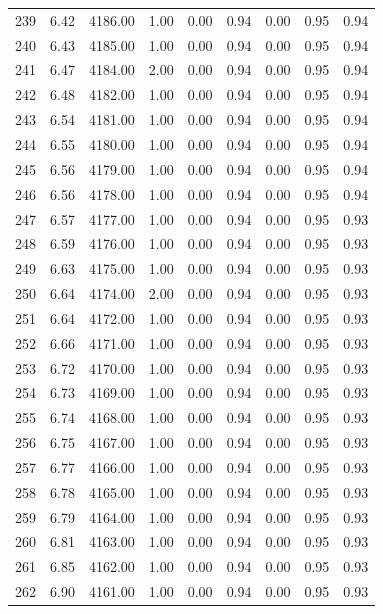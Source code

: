 \documentclass{article}\usepackage[]{graphicx}\usepackage[]{color}
\begin{document}
\begin{longtable}{rrrrrrrrr}
  239 & 6.42 & 4186.00 & 1.00 & 0.00 & 0.94 & 0.00 & 0.95 & 0.94 \\ 
  240 & 6.43 & 4185.00 & 1.00 & 0.00 & 0.94 & 0.00 & 0.95 & 0.94 \\ 
  241 & 6.47 & 4184.00 & 2.00 & 0.00 & 0.94 & 0.00 & 0.95 & 0.94 \\ 
  242 & 6.48 & 4182.00 & 1.00 & 0.00 & 0.94 & 0.00 & 0.95 & 0.94 \\ 
  243 & 6.54 & 4181.00 & 1.00 & 0.00 & 0.94 & 0.00 & 0.95 & 0.94 \\ 
  244 & 6.55 & 4180.00 & 1.00 & 0.00 & 0.94 & 0.00 & 0.95 & 0.94 \\ 
  245 & 6.56 & 4179.00 & 1.00 & 0.00 & 0.94 & 0.00 & 0.95 & 0.94 \\ 
  246 & 6.56 & 4178.00 & 1.00 & 0.00 & 0.94 & 0.00 & 0.95 & 0.94 \\ 
  247 & 6.57 & 4177.00 & 1.00 & 0.00 & 0.94 & 0.00 & 0.95 & 0.93 \\ 
  248 & 6.59 & 4176.00 & 1.00 & 0.00 & 0.94 & 0.00 & 0.95 & 0.93 \\ 
  249 & 6.63 & 4175.00 & 1.00 & 0.00 & 0.94 & 0.00 & 0.95 & 0.93 \\ 
  250 & 6.64 & 4174.00 & 2.00 & 0.00 & 0.94 & 0.00 & 0.95 & 0.93 \\ 
  251 & 6.64 & 4172.00 & 1.00 & 0.00 & 0.94 & 0.00 & 0.95 & 0.93 \\ 
  252 & 6.66 & 4171.00 & 1.00 & 0.00 & 0.94 & 0.00 & 0.95 & 0.93 \\ 
  253 & 6.72 & 4170.00 & 1.00 & 0.00 & 0.94 & 0.00 & 0.95 & 0.93 \\ 
  254 & 6.73 & 4169.00 & 1.00 & 0.00 & 0.94 & 0.00 & 0.95 & 0.93 \\ 
  255 & 6.74 & 4168.00 & 1.00 & 0.00 & 0.94 & 0.00 & 0.95 & 0.93 \\ 
  256 & 6.75 & 4167.00 & 1.00 & 0.00 & 0.94 & 0.00 & 0.95 & 0.93 \\ 
  257 & 6.77 & 4166.00 & 1.00 & 0.00 & 0.94 & 0.00 & 0.95 & 0.93 \\ 
  258 & 6.78 & 4165.00 & 1.00 & 0.00 & 0.94 & 0.00 & 0.95 & 0.93 \\ 
  259 & 6.79 & 4164.00 & 1.00 & 0.00 & 0.94 & 0.00 & 0.95 & 0.93 \\ 
  260 & 6.81 & 4163.00 & 1.00 & 0.00 & 0.94 & 0.00 & 0.95 & 0.93 \\ 
  261 & 6.85 & 4162.00 & 1.00 & 0.00 & 0.94 & 0.00 & 0.95 & 0.93 \\ 
  262 & 6.90 & 4161.00 & 1.00 & 0.00 & 0.94 & 0.00 & 0.95 & 0.93 \\ 

\end{longtable}
\end{document}
